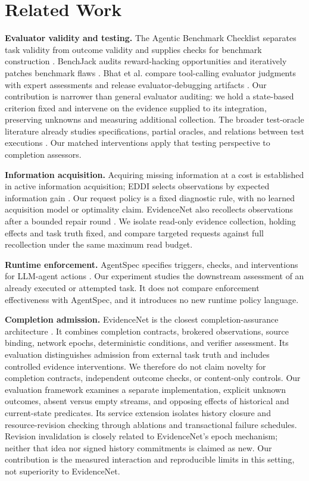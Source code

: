 \documentclass[11pt]{article}
\begin{document}
\section{Related Work}
\textbf{Evaluator validity and testing.} The Agentic Benchmark Checklist separates task validity from outcome validity and supplies checks for benchmark construction \cite{abc}. BenchJack audits reward-hacking opportunities and iteratively patches benchmark flaws \cite{benchjack}. Bhat et al. compare tool-calling evaluator judgments with expert assessments and release evaluator-debugging artifacts \cite{validity}. Our contribution is narrower than general evaluator auditing: we hold a state-based criterion fixed and intervene on the evidence supplied to its integration, preserving unknowns and measuring additional collection. The broader test-oracle literature already studies specifications, partial oracles, and relations between test executions \cite{oracle}. Our matched interventions apply that testing perspective to completion assessors.

\textbf{Information acquisition.} Acquiring missing information at a cost is established in active information acquisition; EDDI selects observations by expected information gain \cite{eddi}. Our request policy is a fixed diagnostic rule, with no learned acquisition model or optimality claim. EvidenceNet also recollects observations after a bounded repair round \cite{evidencenet}. We isolate read-only evidence collection, holding effects and task truth fixed, and compare targeted requests against full recollection under the same maximum read budget.

\textbf{Runtime enforcement.} AgentSpec specifies triggers, checks, and interventions for LLM-agent actions \cite{agentspec}. Our experiment studies the downstream assessment of an already executed or attempted task. It does not compare enforcement effectiveness with AgentSpec, and it introduces no new runtime policy language.

\textbf{Completion admission.} EvidenceNet is the closest completion-assurance architecture \cite{evidencenet}. It combines completion contracts, brokered observations, source binding, network epochs, deterministic conditions, and verifier assessment. Its evaluation distinguishes admission from external task truth and includes controlled evidence interventions. We therefore do not claim novelty for completion contracts, independent outcome checks, or content-only controls. Our evaluation framework examines a separate implementation, explicit unknown outcomes, absent versus empty streams, and opposing effects of historical and current-state predicates. Its service extension isolates history closure and resource-revision checking through ablations and transactional failure schedules. Revision invalidation is closely related to EvidenceNet's epoch mechanism; neither that idea nor signed history commitments is claimed as new. Our contribution is the measured interaction and reproducible limits in this setting, not superiority to EvidenceNet.
\end{document}
